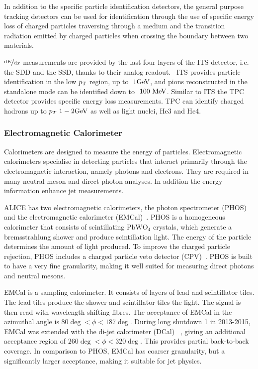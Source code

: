 In addition to the specific particle identification detectors, the general purpose tracking detectors can be used for identification through the use of specific energy loss of charged particles traversing through a medium and the transition radiation emitted by charged particles when crossing the boundary between two materials. 

$\nicefrac{\mathrm{d}E}{\mathrm{d}x}$ measurements are provided by the last four layers of the ITS detector, i.e. the SDD and the SSD, thanks to their analog readout.~\cite{ALICEpid} ITS provides particle identification in the low $p_{\rm T}$ region, up to $~ 1 \mathrm{GeV}\kern-0.05em$, and pions reconstructed in the standalone mode can be identified down to $~100 \mbox{~MeV}$. Similar to ITS the TPC detector provides specific energy loss measurements. TPC can identify charged hadrons up to $p_T ~ 1-2 \mathrm{GeV}\kern-0.05em$ as well as light nuclei, He3 and He4.


\subsubsection{Electromagnetic Calorimeter}
Calorimeters are designed to measure the energy of particles. Electromagnetic calorimeters specialise in detecting particles that interact primarily through the electromagnetic interaction, namely photons and electrons. They are required in many neutral meson and direct photon analyses. In addition the energy information enhance jet measurements.

ALICE has two electromagnetic calorimeters, the photon spectrometer (PHOS)~\cite{phos} and the electromagnetic calorimeter (EMCal)~\cite{emcal}. PHOS is a homogeneous calorimeter that consists of scintillating $\mathrm{PbWO_4}$ crystals, which generate a bremsstrahlung  shower and produce scintillation light. The energy of the particle determines the amount of light produced. To improve the charged particle rejection, PHOS includes a charged particle veto detector (CPV)~\cite{cpv}. PHOS is built to have a very fine granularity, making it well suited for measuring direct photons and neutral mesons.

EMCal is a sampling calorimeter. It consists of layers of lead and scintillator tiles. The lead tiles produce the shower and scintillator tiles the light. The signal is then read with wavelength shifting fibres. The acceptance of EMCal in the azimuthal angle is $ 80\deg < \phi < 187 \deg$. During long shutdown 1 in 2013-2015, EMCal was extended with the di-jet calorimeter (DCal) ~\cite{dcal}, giving an additional acceptance region of $ 260\deg < \phi < 320 \deg$. This provides partial back-to-back coverage. In comparison to PHOS, EMCal has coarser granularity, but a significantly larger acceptance, making it suitable for jet physics.

